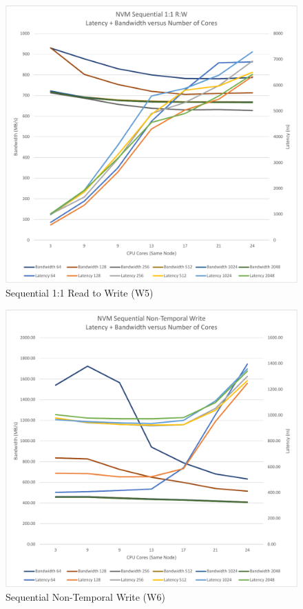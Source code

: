 \begin{figure}
    \centering
    \caption{Sequential 1:1 Read to Write (W5)}\label{chart:sequential:W5}
    \includegraphics[scale=0.5]{charts/sequential-w5-crop.pdf}
\end{figure}


\begin{figure}
    \centering
    \caption{Sequential Non-Temporal Write (W6)}\label{chart:sequential:W6}
    \includegraphics[scale=0.5]{charts/sequential-w6-crop.pdf}
\end{figure}


